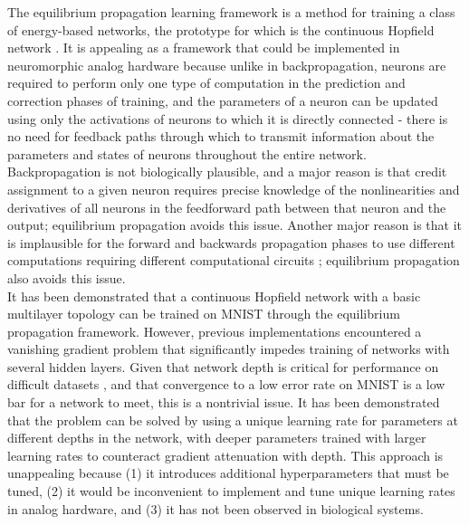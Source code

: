 \documentclass[format=sigconf]{acmart}
\newcommand{\npar}{\\\indent}
\begin{document}
The equilibrium propagation learning framework \cite{scellier17} is a method for training a class of energy-based networks, the prototype for which is the continuous Hopfield network \cite{hopfield1984}. It is appealing as a framework that could be implemented in neuromorphic analog hardware because unlike in backpropagation, neurons are required to perform only one type of computation in the prediction and correction phases of training, and the parameters of a neuron can be updated using only the activations of neurons to which it is directly connected - there is no need for feedback paths through which to transmit information about the parameters and states of neurons throughout the entire network. Backpropagation is not biologically plausible, and a major reason is that credit assignment to a given neuron requires precise knowledge of the nonlinearities and derivatives of all neurons in the feedforward path between that neuron and the output\cite{bengio2015}; equilibrium propagation avoids this issue. Another major reason is that it is implausible for the forward and backwards propagation phases to use different computations requiring different computational circuits \cite{scellier17}; equilibrium propagation also avoids this issue.
\npar
It has been demonstrated \cite{scellier17} that a continuous Hopfield network with a basic multilayer topology can be trained on MNIST \cite{mnist1998} through the equilibrium propagation framework. However, previous implementations encountered a vanishing gradient problem that significantly impedes training of networks with several hidden layers. Given that network depth is critical for performance on difficult datasets \cite{simonyan2014, srivastava2015tvdn}, and that convergence to a low error rate on MNIST is a low bar for a network to meet, this is a nontrivial issue. It has been demonstrated \cite{scellier17} that the problem can be solved by using a unique learning rate for parameters at different depths in the network, with deeper parameters trained with larger learning rates to counteract gradient attenuation with depth. This approach is unappealing because (1) it introduces additional hyperparameters that must be tuned, (2) it would be inconvenient to implement and tune unique learning rates in analog hardware, and (3) it has not been observed in biological systems.
\npar
\end{document}
